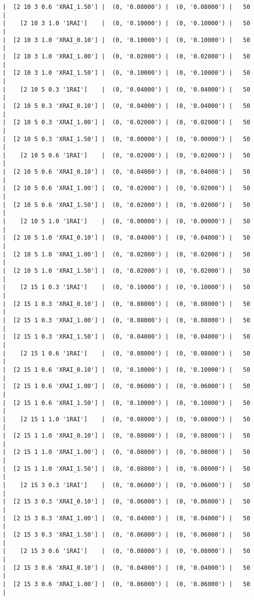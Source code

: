 \documentclass{article}
\begin{document}
\begin{verbatim}
|  [2 10 3 0.6 'XRAI_1.50'] |  (0, '0.08000') |  (0, '0.08000') |   50  |
|    [2 10 3 1.0 '1RAI']    |  (0, '0.10000') |  (0, '0.10000') |   50  |
|  [2 10 3 1.0 'XRAI_0.10'] |  (0, '0.10000') |  (0, '0.10000') |   50  |
|  [2 10 3 1.0 'XRAI_1.00'] |  (0, '0.02000') |  (0, '0.02000') |   50  |
|  [2 10 3 1.0 'XRAI_1.50'] |  (0, '0.10000') |  (0, '0.10000') |   50  |
|    [2 10 5 0.3 '1RAI']    |  (0, '0.04000') |  (0, '0.04000') |   50  |
|  [2 10 5 0.3 'XRAI_0.10'] |  (0, '0.04000') |  (0, '0.04000') |   50  |
|  [2 10 5 0.3 'XRAI_1.00'] |  (0, '0.02000') |  (0, '0.02000') |   50  |
|  [2 10 5 0.3 'XRAI_1.50'] |  (0, '0.00000') |  (0, '0.00000') |   50  |
|    [2 10 5 0.6 '1RAI']    |  (0, '0.02000') |  (0, '0.02000') |   50  |
|  [2 10 5 0.6 'XRAI_0.10'] |  (0, '0.04000') |  (0, '0.04000') |   50  |
|  [2 10 5 0.6 'XRAI_1.00'] |  (0, '0.02000') |  (0, '0.02000') |   50  |
|  [2 10 5 0.6 'XRAI_1.50'] |  (0, '0.02000') |  (0, '0.02000') |   50  |
|    [2 10 5 1.0 '1RAI']    |  (0, '0.00000') |  (0, '0.00000') |   50  |
|  [2 10 5 1.0 'XRAI_0.10'] |  (0, '0.04000') |  (0, '0.04000') |   50  |
|  [2 10 5 1.0 'XRAI_1.00'] |  (0, '0.02000') |  (0, '0.02000') |   50  |
|  [2 10 5 1.0 'XRAI_1.50'] |  (0, '0.02000') |  (0, '0.02000') |   50  |
|    [2 15 1 0.3 '1RAI']    |  (0, '0.10000') |  (0, '0.10000') |   50  |
|  [2 15 1 0.3 'XRAI_0.10'] |  (0, '0.08000') |  (0, '0.08000') |   50  |
|  [2 15 1 0.3 'XRAI_1.00'] |  (0, '0.08000') |  (0, '0.08000') |   50  |
|  [2 15 1 0.3 'XRAI_1.50'] |  (0, '0.04000') |  (0, '0.04000') |   50  |
|    [2 15 1 0.6 '1RAI']    |  (0, '0.08000') |  (0, '0.08000') |   50  |
|  [2 15 1 0.6 'XRAI_0.10'] |  (0, '0.10000') |  (0, '0.10000') |   50  |
|  [2 15 1 0.6 'XRAI_1.00'] |  (0, '0.06000') |  (0, '0.06000') |   50  |
|  [2 15 1 0.6 'XRAI_1.50'] |  (0, '0.10000') |  (0, '0.10000') |   50  |
|    [2 15 1 1.0 '1RAI']    |  (0, '0.08000') |  (0, '0.08000') |   50  |
|  [2 15 1 1.0 'XRAI_0.10'] |  (0, '0.08000') |  (0, '0.08000') |   50  |
|  [2 15 1 1.0 'XRAI_1.00'] |  (0, '0.08000') |  (0, '0.08000') |   50  |
|  [2 15 1 1.0 'XRAI_1.50'] |  (0, '0.08000') |  (0, '0.08000') |   50  |
|    [2 15 3 0.3 '1RAI']    |  (0, '0.06000') |  (0, '0.06000') |   50  |
|  [2 15 3 0.3 'XRAI_0.10'] |  (0, '0.06000') |  (0, '0.06000') |   50  |
|  [2 15 3 0.3 'XRAI_1.00'] |  (0, '0.04000') |  (0, '0.04000') |   50  |
|  [2 15 3 0.3 'XRAI_1.50'] |  (0, '0.06000') |  (0, '0.06000') |   50  |
|    [2 15 3 0.6 '1RAI']    |  (0, '0.08000') |  (0, '0.08000') |   50  |
|  [2 15 3 0.6 'XRAI_0.10'] |  (0, '0.04000') |  (0, '0.04000') |   50  |
|  [2 15 3 0.6 'XRAI_1.00'] |  (0, '0.06000') |  (0, '0.06000') |   50  |

\end{verbatim}
\end{document}
